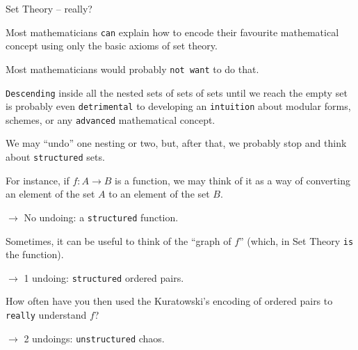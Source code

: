 \documentclass{beamer}
\begin{document}
\begin{frame}[fragile]{Set Theory -- really?}

Most mathematicians {\color{violet}\verb`can`} explain how to encode their favourite mathematical concept using only the basic axioms of set theory.

Most mathematicians would probably {\color{violet}\verb`not want`} to do that.

{\color{violet}\verb`Descending`} inside all the nested sets of sets of sets until we reach the empty set is probably even {\color{violet}\verb`detrimental`} to developing an {\color{violet}\verb`intuition`} about modular forms, schemes, or any {\color{violet}\verb`advanced`} mathematical concept.
\end{frame}

\begin{frame}[fragile]

We may ``undo'' one nesting or two, but, after that, we probably stop and think about {\color{violet}\verb`structured`} sets.
\bigskip

For instance, if $f \colon A \longrightarrow B$ is a function, we may think of it as a way of converting an element of the set $A$ to an element of the set $B$.

$\to$ No undoing: a {\color{violet}\verb`structured`} function.
\bigskip

Sometimes, it can be useful to think of the ``graph of $f$'' (which, in Set Theory {\color{violet}\verb`is`} the function).

$\to$ 1 undoing: {\color{violet}\verb`structured`} ordered pairs.
\bigskip

How often have you then used the Kuratowski's encoding of ordered pairs to {\color{violet}\verb`really`} understand $f$?

$\to$ 2 undoings: {\color{violet}\verb`unstructured`} chaos.
\end{frame}
\end{document}
